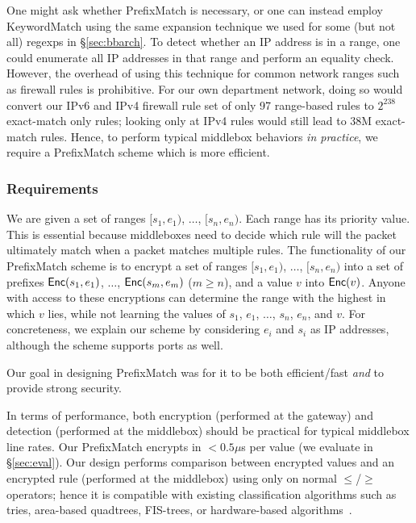 One might ask whether PrefixMatch is necessary, or one can instead employ KeywordMatch using the same expansion technique we used for some (but not all) regexps in \S\ref{sec:bbarch}. 
To detect whether an IP address is in a range, one could enumerate all IP addresses in that range and perform an equality check. However, the overhead of using this technique for common network ranges such as firewall rules is prohibitive.
For our own department network, doing so would convert our IPv6 and IPv4 firewall rule set of only 97 range-based rules to $2^{238}$ exact-match only rules; looking only at IPv4 rules would still lead to 38M exact-match rules.
Hence, to perform typical middlebox behaviors {\it in practice}, we require a PrefixMatch scheme which is more efficient.

\subsubsection{Requirements}
We are given a set of ranges $[s_1, e_1)$, $\dots$, $[s_n, e_n)$. Each range has its priority value. This is essential because middleboxes need to decide which rule will the packet ultimately match when a packet matches multiple rules. The functionality of our PrefixMatch scheme is to encrypt a set of ranges $[s_1, e_1)$, $\dots$, $[s_n, e_n)$ into a set of prefixes $\mathsf{Enc}(s_1, e_1)$, $\dots$, $\mathsf{Enc}(s_m, e_m)$ ($m \geq n$), and a value $v$ into $\mathsf{Enc}(v)$. Anyone with access to these encryptions can determine the range with the highest in which $v$ lies, while not learning the values of $s_1$, $e_1$, $\dots$, $s_n$, $e_n$, and $v$. 
For concreteness, we explain our scheme by considering  $e_i$ and $s_i$ as IP addresses, although the scheme supports ports as well.


Our goal in designing PrefixMatch was for it to be both efficient/fast {\em and} to provide strong security.

In terms of performance, both encryption (performed at the gateway) and detection (performed at the middlebox) should be practical for typical middlebox line rates.
Our PrefixMatch encrypts in $< 0.5\mu$s per value (we evaluate in \S\ref{sec:eval}).
Our design performs comparison between encrypted values and an encrypted rule (performed at the middlebox) using only on normal $\leq$/$\geq$ operators; hence it is compatible with existing classification algorithms such as tries, area-based quadtrees, FIS-trees, or hardware-based algorithms~\cite{packet_classif}.

